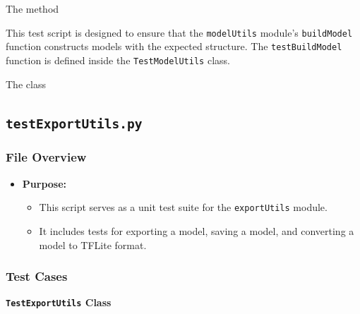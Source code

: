 \begin{code}
	
	
	\caption{The  method}
	\label{code:testBuildModel}
\end{code}

This test script is designed to ensure that the \texttt{modelUtils} module's \texttt{buildModel} function constructs models with the expected structure. The \texttt{testBuildModel} function is defined inside the \texttt{TestModelUtils} class. 

\begin{code}[h!]
	
	
	\caption{The  class}
	\label{code:TestModelUtils}
\end{code}

\subsection{\texttt{testExportUtils.py}}

\subsubsection{File Overview}

\begin{itemize}
	\item \textbf{Purpose:}
	\begin{itemize}
		\item This script serves as a unit test suite for the \texttt{exportUtils} module.
		\item It includes tests for exporting a model, saving a model, and converting a model to TFLite format.
	\end{itemize}
\end{itemize}

\subsubsection{Test Cases}

\textbf{\texttt{TestExportUtils} Class}


